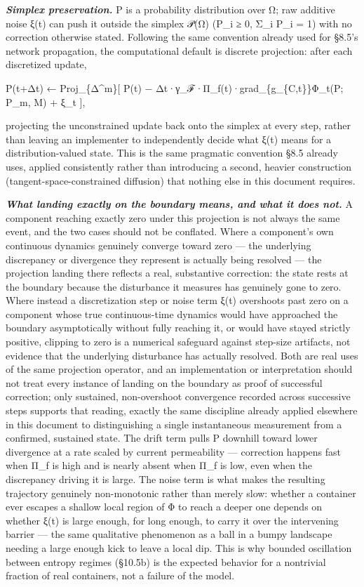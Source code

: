 \documentclass[
]{article}
\begin{document}
\emph{\textbf{Simplex preservation.}} P is a probability distribution
over Ω; raw additive noise ξ(t) can push it outside the simplex 𝒫(Ω)
(P\_i ≥ 0, Σ\_i P\_i = 1) with no correction otherwise stated. Following
the same convention already used for §8.5's network propagation, the
computational default is discrete projection: after each discretized
update,

P(t+Δt) ← Proj\_\{Δ\^{}m\}{[} P(t) −
Δt·γ\_ℱ·Π\_f(t)·grad\_\{g\_\{C,t\}\}Φ\_t(P; P\_m, M) + ξ\_t {]},

projecting the unconstrained update back onto the simplex at every step,
rather than leaving an implementer to independently decide what ξ(t)
means for a distribution-valued state. This is the same pragmatic
convention §8.5 already uses, applied consistently rather than
introducing a second, heavier construction (tangent-space-constrained
diffusion) that nothing else in this document requires.

\emph{\textbf{What landing exactly on the boundary means, and what it
does not.}} A component reaching exactly zero under this projection is
not always the same event, and the two cases should not be conflated.
Where a component's own continuous dynamics genuinely converge toward
zero --- the underlying discrepancy or divergence they represent is
actually being resolved --- the projection landing there reflects a
real, substantive correction: the state rests at the boundary because
the disturbance it measures has genuinely gone to zero. Where instead a
discretization step or noise term ξ(t) overshoots past zero on a
component whose true continuous-time dynamics would have approached the
boundary asymptotically without fully reaching it, or would have stayed
strictly positive, clipping to zero is a numerical safeguard against
step-size artifacts, not evidence that the underlying disturbance has
actually resolved. Both are real uses of the same projection operator,
and an implementation or interpretation should not treat every instance
of landing on the boundary as proof of successful correction; only
sustained, non-overshoot convergence recorded across successive steps
supports that reading, exactly the same discipline already applied
elsewhere in this document to distinguishing a single instantaneous
measurement from a confirmed, sustained state. The drift term pulls P
downhill toward lower divergence at a rate scaled by current
permeability --- correction happens fast when Π\_f is high and is nearly
absent when Π\_f is low, even when the discrepancy driving it is large.
The noise term is what makes the resulting trajectory genuinely
non-monotonic rather than merely slow: whether a container ever escapes
a shallow local region of Φ to reach a deeper one depends on whether
ξ(t) is large enough, for long enough, to carry it over the intervening
barrier --- the same qualitative phenomenon as a ball in a bumpy
landscape needing a large enough kick to leave a local dip. This is why
bounded oscillation between entropy regimes (§10.5b) is the expected
behavior for a nontrivial fraction of real containers, not a failure of
the model.
\end{document}
